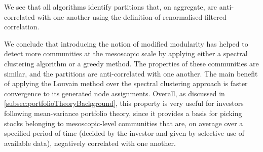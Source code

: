 We see that all algorithms identify partitions that, on aggregate, are anti-correlated with one another using the definition of renormalised filtered correlation.

We conclude that introducing the notion of modified modularity has helped to detect more communities at the mesoscopic scale by applying either a spectral clustering algorithm or a greedy method.
The properties of these communities are similar, and the partitions are anti-correlated with one another.
The main benefit of applying the Louvain method over the spectral clustering approach is faster convergence to its generated node assignments.
Overall, as discussed in \cref{subsec:portfolioTheoryBackground}, this property is very useful for investors following mean-variance portfolio theory, since it provides a basis for picking stocks belonging to mesoscopic-level communities that are, on average over a specified period of time (decided by the investor and given by selective use of available data), negatively correlated with one another.

